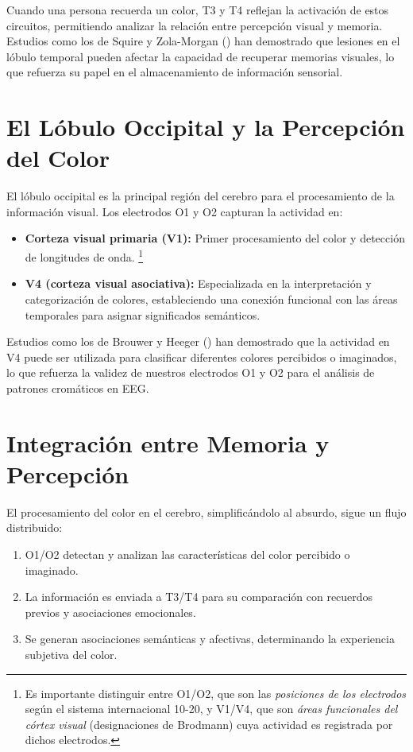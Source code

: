 Cuando una persona recuerda un color, T3 y T4 reflejan la activación de estos circuitos, permitiendo analizar la relación entre percepción visual y memoria. Estudios como los de Squire y Zola-Morgan (\citeyear{Squire_Zola_Morgan_1991}) han demostrado que lesiones en el lóbulo temporal pueden afectar la capacidad de recuperar memorias visuales, lo que refuerza su papel en el almacenamiento de información sensorial.

\section{El Lóbulo Occipital y la Percepción del Color}

El lóbulo occipital es la principal región del cerebro para el procesamiento de la información visual.  Los electrodos O1 y O2 capturan la actividad en:

\begin{itemize}
    \item \textbf{Corteza visual primaria (V1):} Primer procesamiento del color y detección de longitudes de onda. \footnote{Es importante distinguir entre O1/O2, que son las \textit{posiciones de los electrodos} según el sistema internacional 10-20, y V1/V4, que son \textit{áreas funcionales del córtex visual} (designaciones de Brodmann) cuya actividad es registrada por dichos electrodos.}
    
    \item \textbf{V4 (corteza visual asociativa):} Especializada en la interpretación y categorización de colores, estableciendo una conexión funcional con las áreas temporales para asignar significados semánticos.
\end{itemize}

Estudios como los de Brouwer y Heeger (\citeyear{Brouwer_Heeger_2013}) han demostrado que la actividad en V4 puede ser utilizada para clasificar diferentes colores percibidos o imaginados, lo que refuerza la validez de nuestros electrodos O1 y O2 para el análisis de patrones cromáticos en EEG.

\newpage

\section{Integración entre Memoria y Percepción}
El procesamiento del color en el cerebro, simplificándolo al absurdo, sigue un flujo distribuido:
\begin{enumerate}
    \item O1/O2 detectan y analizan las características del color percibido o imaginado.
    \item La información es enviada a T3/T4 para su comparación con recuerdos previos y asociaciones emocionales.
    \item Se generan asociaciones semánticas y afectivas, determinando la experiencia subjetiva del color.
\end{enumerate}


